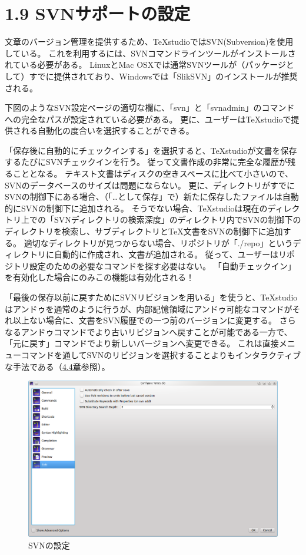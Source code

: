 \documentclass[]{book}
\makeatletter
\def\maxwidth{\ifdim\Gin@nat@width>\linewidth\linewidth
\else\Gin@nat@width\fi}
\let\Oldincludegraphics\includegraphics
\renewcommand{\includegraphics}[1]{\Oldincludegraphics[width=\maxwidth]{#1}}
\makeatother
\begin{document}
\section{1.9 SVNサポートの設定}

文章のバージョン管理を提供するため、TeXstudioではSVN(Subversion)を使用している。
これを利用するには、SVNコマンドラインツールがインストールされている必要がある。
LinuxとMac
OSXでは通常SVNツールが（パッケージとして）すでに提供されており、Windowsでは「SlikSVN」のインストールが推奨される。

下図のようなSVN設定ページの適切な欄に、「svn」と「svnadmin」のコマンドへの完全なパスが設定されている必要がある。
更に、ユーザーはTeXstudioで提供される自動化の度合いを選択することができる。

「保存後に自動的にチェックインする」を選択すると、TeXstudioが文書を保存するたびにSVNチェックインを行う。
従って文書作成の非常に完全な履歴が残ることとなる。
テキスト文書はディスクの空きスペースに比べて小さいので、SVNのデータベースのサイズは問題にならない。
更に、ディレクトリがすでにSVNの制御下にある場合、（「\ldots{}として保存」で）新たに保存したファイルは自動的にSVNの制御下に追加される。
そうでない場合、TeXstudioは現在のディレクトリ上での「SVNディレクトリの検索深度」のディレクトリ内でSVNの制御下のディレクトリを検索し、サブディレクトリとTeX文書をSVNの制御下に追加する。
適切なディレクトリが見つからない場合、リポジトリが「./repo」というディレクトリに自動的に作成され、文書が追加される。
従って、ユーザーはリポジトリ設定のための必要なコマンドを探す必要はない。
「自動チェックイン」を有効化した場合にのみこの機能は有効化される！

「最後の保存以前に戻すためにSVNリビジョンを用いる」を使うと、TeXstudioはアンドゥを通常のように行うが、内部記憶領域にアンドゥ可能なコマンドがそれ以上ない場合に、文書をSVN履歴での一つ前のバージョンに変更する。
さらなるアンドゥコマンドでより古いリビジョンへ戻すことが可能である一方で、「元に戻す」コマンドでより新しいバージョンへ変更できる。
これは直接メニューコマンドを通してSVNのリビジョンを選択することよりもインタラクティブな手法である（\hyperref[SECTION33a]{4.4章}参照）。

\begin{figure}[htbp]
\centering
\includegraphics{configure_svn.png}
\caption{SVNの設定}
\end{figure}
\end{document}
